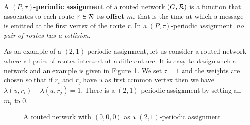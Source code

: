 \documentclass[10pt, conference, letterpaper]{IEEEtran}
\begin{document}
         A {\bf $(P,\tau)$-periodic assignment} of a routed network $(G,\cal R)$ is a function that associates to each route 
         $r \in \cal R$ its \textbf{offset} $m_r$ that is the time at which a message is emitted at the first vertex of the route $r$.  In a $(P,\tau)$-periodic assignment, \emph{no pair of routes has a collision}.
	 
	 
      As an example of a $(2,1)$-periodic assignment, let us consider a routed network 
      where all pairs of routes intersect at a different arc. It is easy to design such a network and an example is given in Figure~\ref{fig:example}. We set $\tau = 1$ and the weights are chosen so that if $r_{i}$ and $r_{j}$ have $u$ as first common vertex then we have $\lambda(u,r_{i}) - \lambda(u,r_{j})=1$. There is a $(2,1)$-periodic assignment by setting all $m_{i}$ to $0$.

  
      \begin{figure}[ht]
      \begin{center}
     \end{center}
       \caption{A routed network with $(0,0,0)$ as a $(2,1)$-periodic assignment}
       \label{fig:example}
      \end{figure}
\end{document}
